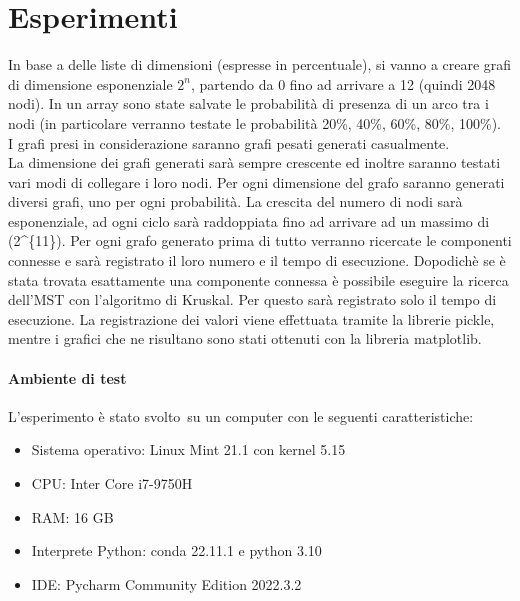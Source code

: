 \documentclass[
]{article}
\begin{document}
\hypertarget{esperimenti}{%
\section{Esperimenti}\label{esperimenti}}

In base a delle liste di dimensioni (espresse in percentuale), si vanno
a creare grafi di dimensione esponenziale \(2^n\), partendo da 0 fino ad
arrivare a 12 (quindi 2048 nodi). In un array sono state salvate le
probabilità di presenza di un arco tra i nodi (in particolare verranno
testate le probabilità 20\%, 40\%, 60\%, 80\%, 100\%).\\
I grafi presi in considerazione saranno grafi pesati generati
casualmente.\\
La dimensione dei grafi generati sarà sempre crescente ed inoltre
saranno testati vari modi di collegare i loro nodi. Per ogni dimensione
del grafo saranno generati diversi grafi, uno per ogni probabilità. La
crescita del numero di nodi sarà esponenziale, ad ogni ciclo sarà
raddoppiata fino ad arrivare ad un massimo di (2\^{}\{11\}). Per ogni
grafo generato prima di tutto verranno ricercate le componenti connesse
e sarà registrato il loro numero e il tempo di esecuzione. Dopodichè se
è stata trovata esattamente una componente connessa è possibile eseguire
la ricerca dell'MST con l'algoritmo di Kruskal. Per questo sarà
registrato solo il tempo di esecuzione. La registrazione dei valori
viene effettuata tramite la librerie pickle, mentre i grafici che ne
risultano sono stati ottenuti con la libreria matplotlib.

\hypertarget{ambiente-di-test}{%
\paragraph{Ambiente di test}\label{ambiente-di-test}}

L'esperimento è stato svolto~su un computer con le seguenti
caratteristiche:

\begin{itemize}
\item
  Sistema operativo: Linux Mint 21.1 con kernel 5.15
\item
  CPU: Inter Core i7-9750H
\item
  RAM: 16 GB
\item
  Interprete Python: conda 22.11.1 e python 3.10
\item
  IDE: Pycharm Community Edition 2022.3.2
\end{itemize}
\end{document}
